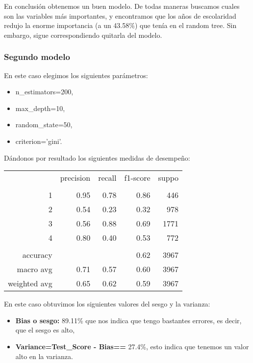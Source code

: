 \documentclass[a4paper]{article}
\begin{document}
             En conclusión obtenemos un buen modelo. De todas maneras buscamos cuales son las variables más importantes, y encontramos que los años de escolaridad redujo la enorme importancia (a un 43.58\%) que tenía en el random tree. Sin embargo, sigue correspondiendo quitarla del modelo.

        \subsubsection{Segundo modelo}

            En este caso elegimos los siguientes parámetros:
            \begin{itemize}
                \item n\_estimators=200,
                \item max\_depth=10,
                \item random\_state=50,
                \item criterion='gini'.
            \end{itemize}

            Dándonos por resultado los siguientes medidas de desempeño:
            \begin{table}[H]
                \centering
                \begin{tabular}{rrrrr}
                    ~ & precision & recall & f1-score & suppo \\
                    & & & & \\
                    1 & 0.95 & 0.78 & 0.86 & 446 \\
                    2 & 0.54 & 0.23 & 0.32 & 978 \\
                    3 & 0.56 & 0.88 & 0.69 & 1771 \\
                    4 & 0.80 & 0.40 & 0.53 & 772 \\
                    & & & & \\
                    accuracy & & & 0.62 & 3967 \\
                    macro avg & 0.71 & 0.57 & 0.60 & 3967 \\
                    weighted avg & 0.65 & 0.62 & 0.59 & 3967 \\
                \end{tabular}
            \end{table}

            En este caso  obtuvimos los siguientes valores del sesgo y la varianza:
            \begin{itemize}
                \item \textbf{Bias o sesgo:} 89.11\% que nos indica que tengo bastantes errores, es decir, que el sesgo es alto,
                \item \textbf{Variance=Test\_Score - Bias==} 27.4\%, esto indica que tenemos un valor alto en la varianza.
             \end{itemize}
\end{document}
